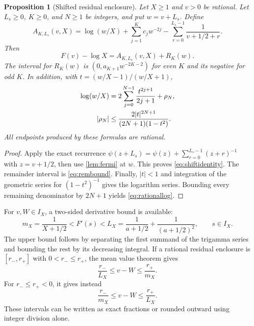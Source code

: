 \documentclass[11pt,a4paper]{article}
\newtheorem{proposition}[theorem]{Proposition}
\theoremstyle{definition}
\numberwithin{equation}{section}
\begin{document}
\begin{proposition}[Shifted residual enclosure]
\label{prop:shiftcertificate}
Let $X\ge1$ and $v>0$ be rational. Let $L_s\ge0$, $K\ge0$, and $N\ge1$ be integers, and put $w=v+L_s$. Define
\begin{equation}
 A_{K,L_s}(v,X)=\log(w/X)+\sum_{j=1}^Kc_jw^{-2j}
                -\sum_{r=0}^{L_s-1}\frac1{v+1/2+r}.
 \label{eq:shiftresidual}
\end{equation}
Then
\begin{equation}
 F(v)-\log X=A_{K,L_s}(v,X)+R_K(w).
 \label{eq:shiftidentity}
\end{equation}
The interval for $R_K(w)$ is $(0,a_{K+1}w^{-2K-2})$ for even $K$ and its negative for odd $K$. In addition, with $t=(w/X-1)/(w/X+1)$,
\begin{align}
 \log(w/X)&=2\sum_{j=0}^{N-1}\frac{t^{2j+1}}{2j+1}+\rho_N,\notag\\
 |\rho_N|&\le\frac{2|t|^{2N+1}}{(2N+1)(1-t^2)}.
 \label{eq:rationallog}
\end{align}
All endpoints produced by these formulas are rational.
\end{proposition}
\begin{proof}
Apply the exact recurrence
$\psi(z+L_s)=\psi(z)+\sum_{r=0}^{L_s-1}(z+r)^{-1}$
with $z=v+1/2$, then use \cref{lem:fermi} at $w$. This proves \eqref{eq:shiftidentity}. The remainder interval is \eqref{eq:rembound}. Finally, $|t|<1$ and integration of the geometric series for $(1-t^2)^{-1}$ gives the logarithm series. Bounding every remaining denominator by $2N+1$ yields \eqref{eq:rationallog}.
\end{proof}

For $v,W\in I_X$, a two-sided derivative bound is available:
\begin{equation}
 m_X=\frac1{X+1/2}<F'(s)<
 L_X=\frac1{a+1/2}+\frac1{(a+1/2)^2},\qquad s\in I_X.
 \label{eq:twoslope}
\end{equation}
The upper bound follows by separating the first summand of the trigamma series and bounding the rest by its decreasing integral. If a rational residual enclosure is $[r_-,r_+]$ with $0<r_-\le r_+$, the mean value theorem gives
\begin{equation}
 \frac{r_-}{L_X}\le v-W\le\frac{r_+}{m_X}.
 \label{eq:positivecertificate}
\end{equation}
For $r_-\le r_+<0$, it gives instead
\begin{equation}
 \frac{r_-}{m_X}\le v-W\le\frac{r_+}{L_X}.
 \label{eq:negativecertificate}
\end{equation}
These intervals can be written as exact fractions or rounded outward using integer division alone.
\end{document}
